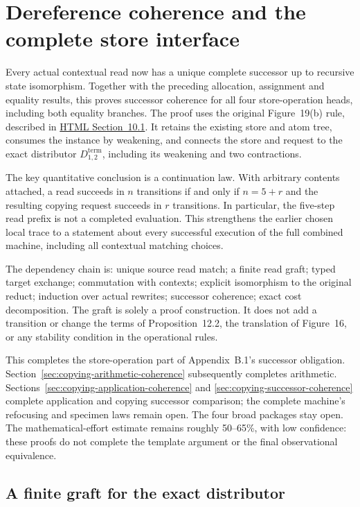 \clearpage
\section{Dereference coherence and the complete store interface}
\label{sec:copying-dereference-coherence}
Every actual contextual read now has a unique complete successor up to
recursive state isomorphism. Together with the preceding allocation,
assignment and equality results, this proves successor coherence for all
four store-operation heads, including both equality branches. The proof
uses the original Figure~19(b) rule, described in
\href{https://arxiv.org/html/1907.01257v5\#S10.SS1}{HTML Section~10.1}.
It retains the existing store and atom tree, consumes the instance by weakening,
and connects the store and request to the exact distributor
$D^{\mathrm{term}}_{1,2}$, including its weakening and two contractions.

The key quantitative conclusion is a continuation law. With arbitrary contents
attached, a read succeeds in $n$ transitions if and only if $n=5+r$ and
the resulting copying request succeeds in $r$ transitions. In particular,
the five-step read prefix is not a completed evaluation. This strengthens
the earlier chosen local trace to a statement about every successful execution
of the full combined machine, including all contextual matching choices.

The dependency chain is: unique source read match; a finite read graft;
typed target exchange; commutation with contexts; explicit isomorphism to
the original reduct; induction over actual rewrites; successor coherence;
exact cost decomposition. The graft is solely a proof construction. It does
not add a transition or change the terms of Proposition~12.2, the translation
of Figure~16, or any stability condition in the operational rules.

This completes the store-operation part of Appendix~B.1's successor obligation.
Section~\ref{sec:copying-arithmetic-coherence} subsequently completes arithmetic.
Sections~\ref{sec:copying-application-coherence} and \ref{sec:copying-successor-coherence} complete application and copying successor comparison;
the complete machine's refocusing and specimen laws remain open. The four
broad packages stay open. The mathematical-effort estimate remains roughly
50--65\%, with low confidence: these proofs do not complete the template
argument or the final observational equivalence.

\subsection{A finite graft for the exact distributor}

